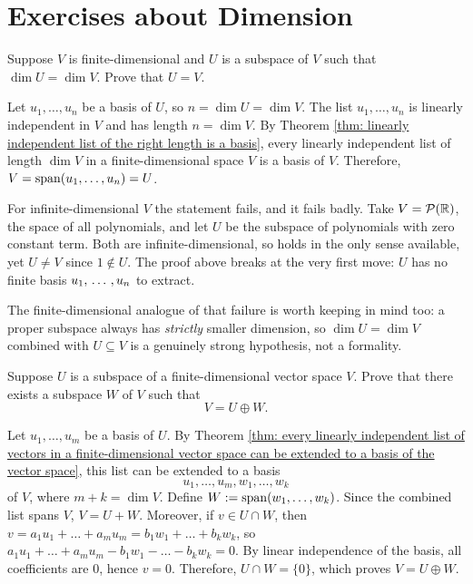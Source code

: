 \section*{Exercises about Dimension}

\begin{xrcs}
  Suppose $V$ is finite-dimensional and $U$ is a subspace of $V$ such that $\dim U = \dim V$. Prove that $U = V$.

  \begin{xprf}
    Let $u_1, \dots, u_n$ be a basis of $U$, so $n = \dim U = \dim V$.
    The list $u_1, \dots, u_n$ is linearly independent in $V$ and has length $n = \dim V$.
    By Theorem \ref{thm: linearly independent list of the right length is a basis}, every linearly independent list of length $\dim V$ in a finite-dimensional space $V$ is a basis of $V$.
    Therefore, $V = \operatorname{span} (u_1, \dots, u_n) = U$.
  \end{xprf}
\end{xrcs}

\begin{ainote}
  For infinite-dimensional $V$ the statement fails, and it fails badly. Take $V = \mathcal{P}(\mathbb{R})$, the space of all polynomials, and let $U$ be the subspace of polynomials with zero constant term. Both are infinite-dimensional, so  holds in the only sense available, yet $U \neq V$ since $1 \notin U$. The proof above breaks at the very first move: $U$ has no finite basis $u_1, {\, \ldots \,\,}, u_n$ to extract.

  The finite-dimensional analogue of that failure is worth keeping in mind too: a proper subspace always has \emph{strictly} smaller dimension, so $\dim U = \dim V$ combined with $U \subseteq V$ is a genuinely strong hypothesis, not a formality.
\end{ainote}

\begin{xrcs}
  Suppose $U$ is a subspace of a finite-dimensional vector space $V$. Prove that there exists a subspace $W$ of $V$ such that
  \begin{equation}
    V = U \oplus W.
  \end{equation}
  \begin{xprf}
    Let $u_1, \dots, u_m$ be a basis of $U$.
    By Theorem \ref{thm: every linearly independent list of vectors in a finite-dimensional vector space can be extended to a basis of the vector space}, this list can be extended to a basis
    \[
      u_1, \dots, u_m, w_1, \dots, w_k
    \]
    of $V$, where $m + k = \dim V$.
    Define $W := \operatorname{span} (w_1, \dots, w_k)$.
    Since the combined list spans $V$, $V = U + W$.
    Moreover, if $v \in U \cap W$, then $v = a_1 u_1 + \dots + a_m u_m = b_1 w_1 + \dots + b_k w_k$, so
    $a_1 u_1 + \dots + a_m u_m - b_1 w_1 - \dots - b_k w_k = 0$.
    By linear independence of the basis, all coefficients are $0$, hence $v = 0$.
    Therefore, $U \cap W = \{0\}$, which proves $V = U \oplus W$.
  \end{xprf}
\end{xrcs}

